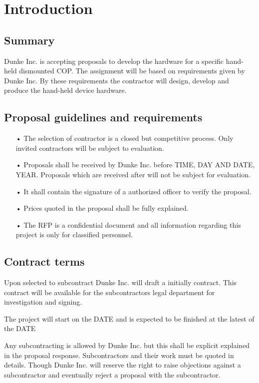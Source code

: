 \chapter{Introduction}
\section{Summary}
Dunke Inc. is accepting proposals to develop the hardware for a specific hand-held dismounted COP. The assignment will be based on requirements given by Dunke Inc. By these requirements the contractor will design, develop and produce the hand-held device hardware. 

\section{Proposal guidelines and requirements}

\begin{enumerate}

\item[•]The selection of contractor is a closed but competitive process. Only invited contractors will be subject to evaluation. 
\item[•]Proposals shall be received by Dunke Inc. before TIME, DAY AND DATE, YEAR. Proposals which are received after will not be subject for evaluation. 
\item[•]It shall contain the signature of a authorized officer to verify the proposal. 
\item[•]Prices quoted in the proposal shall be fully explained.
\item[•]The RFP is a confidential document and all information regarding this project is only for classified personnel. 
\end{enumerate}


\section{Contract terms}
Upon selected to subcontract Dunke Inc. will draft a initially contract. This contract will be available for the subcontractors legal department for investigation and signing. 

The project will start on the DATE and is expected to be finished at the latest of the DATE  

Any subcontracting is allowed by Dunke Inc. but this shall be explicit explained in the proposal response. 
Subcontractors and their work must be quoted in details. 
Though Dunke Inc. will reserve the right to raise objections against a subcontractor and eventually reject a proposal with the subcontractor. 

